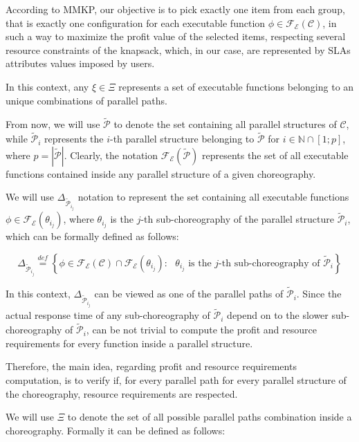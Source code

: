 \documentclass[12pt,a4paper]{report}
\newcommand{\mathDef}{\overset{\textit{def}}{=}}
\newcommand{\N}{\mathbb{N}}
\begin{document}
According to MMKP, our objective is to pick exactly one item from each group, that is exactly one configuration for each executable function $\phi \in \mathscr{F_E}(\mathcal{C})$, in such a way to maximize the profit value of the selected items, respecting several resource constraints of the knapsack, which, in our case, are represented by SLAs attributes values imposed by users. 



In this context, any $\xi \in \Xi$ represents a set of executable functions belonging to an unique combinations of parallel paths.

From now, we will use $\mathcal{\widetilde{P}}$ to denote the set containing all parallel structures of $\mathcal{C}$, while $\mathcal{\widetilde{P}}_i$ represents the $i$-th parallel structure belonging to $\mathcal{\widetilde{P}}$ for $i \in \N \cap \left[1;p \right]$, where $p = |\mathcal{\widetilde{P}}|$. Clearly, the notation $\mathscr{F_E}(\mathcal{\widetilde{P}})$ represents the set of all executable functions contained inside any parallel structure of a given choreography.

We will use $\Delta_{\mathcal{\widetilde{P}}_{i_j}}$ notation to represent the set containing all executable functions $\phi \in \mathscr{F_E}(\theta_{i_j})$, where $\theta_{i_j}$ is the $j$-th sub-choreography of the parallel structure $\mathcal{\widetilde{P}}_i$, which can be formally defined as follows:

\begin{equation}
	\Delta_{\mathcal{\widetilde{P}}_{i_j}} \mathDef \left\{ \phi \in \mathscr{F_E}(\mathcal{C}) \cap \mathscr{F_E}(\theta_{i_j}) : \text{  $\theta_{i_j}$ is the $j$-th sub-choreography of } \mathcal{\widetilde{P}}_i \right\} 
\end{equation}

In this context, $\Delta_{\mathcal{\widetilde{P}}_{i_j}}$ can be viewed as one of the parallel paths of $\mathcal{\widetilde{P}}_i$. Since the actual response time of any sub-choreography of $\mathcal{\widetilde{P}}_i$ depend on to the slower sub-choreography of $\mathcal{\widetilde{P}}_i$, can be not trivial to compute the profit and resource requirements for every function inside a parallel structure.  

Therefore, the main idea, regarding profit and resource requirements computation, is to verify if, for every parallel path for every parallel structure of the choreography, resource requirements are respected. 

We will use $\Xi$ to denote the set of all possible parallel paths combination inside a choreography. Formally it can be defined as follows: 
\end{document}
